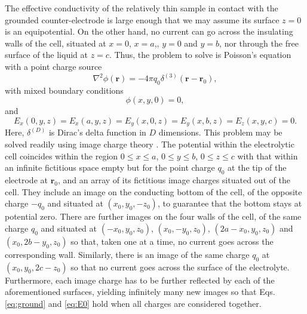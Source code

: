 \documentclass[review,sort&compress]{cas-sc}
\begin{document}
The effective conductivity of the relatively thin sample in contact
with the grounded counter-electrode is large enough that we may assume its
surface $z=0$ is an equipotential.
On the other hand, no current can go across the insulating walls of
the cell, situated at $x=0$, $x=a$,, $y=0$ and $y=b$, nor through the
free surface of the liquid at $z=c$. Thus, the problem to solve is Poisson's
equation with a point charge source
\begin{equation}
  \label{eq:poisson}
  \nabla^2\phi(\bm r)=-4\pi q_0\delta^{(3)}(\bm r-\bm r_0),
\end{equation}
with mixed boundary conditions
\begin{equation}
  \label{eq:ground}
  \phi(x,y,0)=0,
\end{equation}
and
\begin{equation}
  \label{eq:E0}
E_x(0, y ,z)= E_x(a, y ,z)=E_y(x, 0 ,z)=E_y(x, b
,z)=E_z(x, y ,c)=0.
\end{equation}
Here, $\delta^{(D)}$ is Dirac's delta function in $D$ dimensions.
This problem may be solved readily using image charge theory \cite{jackson1975classical}.
The potential within the electrolytic cell coincides
within the region $0\le x\le a$, $0\le y \le b$, $0\le z\le c$
with that within an infinite fictitious space  empty but for the point charge
$q_0$ at the tip of the electrode at $\bm r_0$, and an array of its fictitious image
charges situated out of the cell. They include an image on the conducting bottom of the
cell, of the opposite charge $-q_0$ and situated at $(x_0, y_0,-z_0)$,
to guarantee that the bottom stays at potential zero.
There are further images on the four walls of the cell, of the same charge $q_0$
and situated at $(-x_0,y_0,z_0)$, $(x_0,-y_0, z_0)$, $(2a-x_0, y_0,
z_0)$ and $(x_0, 2b-y_0,z_0)$ so that, taken one at a time, no current goes across
the corresponding wall. Similarly, there is an image of the same charge $q_0$ at
$(x_0,y_0,2c-z_0)$ so that no current goes across the
surface of the electrolyte. Furthermore, each image charge has to be
further reflected by each of the aforementioned surfaces, yielding
infinitely many new images so that Eqs. \eqref{eq:ground} and
\eqref{eq:E0} hold when all charges are considered together.
\end{document}
